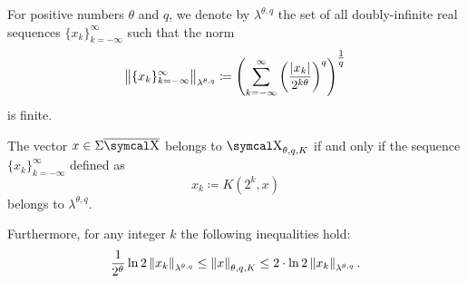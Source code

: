 \begin{definition}\label{def:discrete_k_interpolation_space}
  For positive numbers \( \theta \) and \( q \), we denote by \( \lambda^{\theta,q} \) the set of all doubly-infinite real sequences \( \{ x_k \}_{k=-\infty}^\infty \) such that the norm
  \begin{equation}\label{def:discrete_k_interpolation_space}
    \left\Vert \{ x_k \}_{k=-\infty}^\infty \right\Vert_{\lambda^{\theta,q}} \coloneqq \left( \sum_{k=-\infty}^\infty \left( \frac {\left\vert x_k \right\vert} {2^{k\theta}} \right)^q \right)^{\tfrac 1 q}
  \end{equation}
  is finite.
\end{definition}

\begin{theorem}\label{thm:discrete_k_interpolation}
  The vector \( x \in \Sigma\Ol{\CX} \) belongs to \hyperref[def:k_functional_interpolation_space]{\( \CX_{\theta,q,K} \)} if and only if the sequence \( \{ x_k \}_{k=-\infty}^\infty \) defined as
  \begin{equation}\label{eq:thm:discrete_k_interpolation/sequence}
    x_k \coloneqq K(2^k, x)
  \end{equation}
  belongs to \hyperref[def:discrete_k_interpolation_space]{\( \lambda^{\theta,q} \)}.

  Furthermore, for any integer \( k \) the following inequalities hold:
  \begin{equation}\label{eq:thm:discrete_k_interpolation/inequalities}
    \frac 1 {2^\theta} \ln 2 \left\Vert x_k \right\Vert_{\lambda^{\theta,q}}
    \leq
    \left\Vert x \right\Vert_{\theta,q,K}
    \leq
    2 \cdot \ln 2 \left\Vert x_k \right\Vert_{\lambda^{\theta,q}}.
  \end{equation}
\end{theorem}
